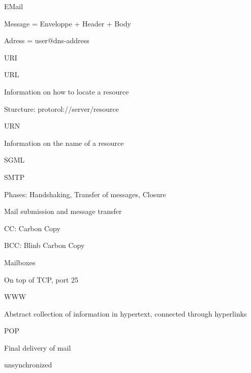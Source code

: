 \documentclass[main.tex]{subfiles}
\begin{document}
\begin{card}{EMail}
\item Message = Enveloppe + Header + Body
\item Adress = user@dns-address
\end{card}


\begin{card}{URI}
\item 
\end{card}


\begin{card}{URL}
\item Information on how to locate a resource
\item Sturcture: protorol://server/resource
\end{card}


\begin{card}{URN}
\item Information on the name of a resource
\end{card}


\begin{card}{SGML}
\item 
\end{card}


\begin{card}{SMTP}
\item Phases: Handshaking, Transfer  of  messages, Closure
\item Mail submission and message transfer
\item CC: Carbon Copy
\item BCC: Blinb Carbon Copy
\item Mailboxes
\item On top of TCP, port 25
\end{card}



\begin{card}{WWW}
\item Abstract collection of information in hypertext, connected through hyperlinks
\end{card}


\begin{card}{POP}
\item Final delivery of mail
\item unsynchronized
\end{card}
\end{document}
